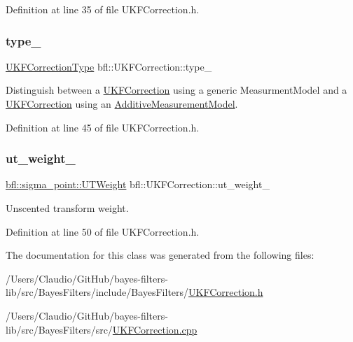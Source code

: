 Definition at line 35 of file U\+K\+F\+Correction.\+h.

\mbox{\label{classbfl_1_1UKFCorrection_a9fa808a3b38a3648427c91e1644ec3d9}} 
\subsubsection{\texorpdfstring{type\+\_\+}{type\_}}
{\footnotesize\ttfamily \mbox{\hyperlink{classbfl_1_1UKFCorrection_afb5f790b458629da1f1f0e1b7c0a1f0d}{U\+K\+F\+Correction\+Type}} bfl\+::\+U\+K\+F\+Correction\+::type\+\_\+\hspace{0.3cm}{\ttfamily [protected]}}



Distinguish between a \mbox{\hyperlink{classbfl_1_1UKFCorrection}{U\+K\+F\+Correction}} using a generic Measurment\+Model and a \mbox{\hyperlink{classbfl_1_1UKFCorrection}{U\+K\+F\+Correction}} using an \mbox{\hyperlink{classbfl_1_1AdditiveMeasurementModel}{Additive\+Measurement\+Model}}. 



Definition at line 45 of file U\+K\+F\+Correction.\+h.

\mbox{\label{classbfl_1_1UKFCorrection_acbf78f4c885eb1721ffea18c62ce5dec}} 
\subsubsection{\texorpdfstring{ut\+\_\+weight\+\_\+}{ut\_weight\_}}
{\footnotesize\ttfamily \mbox{\hyperlink{structbfl_1_1sigma__point_1_1UTWeight}{bfl\+::sigma\+\_\+point\+::\+U\+T\+Weight}} bfl\+::\+U\+K\+F\+Correction\+::ut\+\_\+weight\+\_\+\hspace{0.3cm}{\ttfamily [protected]}}



Unscented transform weight. 



Definition at line 50 of file U\+K\+F\+Correction.\+h.



The documentation for this class was generated from the following files\+:\begin{DoxyCompactItemize}
\item 
/\+Users/\+Claudio/\+Git\+Hub/bayes-\/filters-\/lib/src/\+Bayes\+Filters/include/\+Bayes\+Filters/\mbox{\hyperlink{UKFCorrection_8h}{U\+K\+F\+Correction.\+h}}\item 
/\+Users/\+Claudio/\+Git\+Hub/bayes-\/filters-\/lib/src/\+Bayes\+Filters/src/\mbox{\hyperlink{UKFCorrection_8cpp}{U\+K\+F\+Correction.\+cpp}}\end{DoxyCompactItemize}
